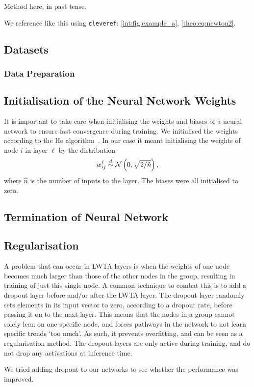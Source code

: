 Method here, in past tense.

We reference like this using \verb|cleveref|: \cref{int:fig:example_a}, \cref{theo:eq:newton2}.

\subsection{Datasets}

    \subsubsection{Data Preparation}


\subsection{Initialisation of the Neural Network Weights}
    It is important to take care when initialising the weights and biases of a neural network to ensure fast convergence during training. We initialised the weights according to the He algorithm~\citep{He}. In our case it meant initialising the weights of node $i$ in layer $\ell$ by the distribution
    \begin{align}
        w^\ell_{ij} \overset{d}{\sim} \operatorname{\mathcal{N}}\left(0,\sqrt{2/\hat{n}}\right),
    \end{align}
    where $\hat{n}$ is the number of inputs to the layer. The biases were all initialised to zero.


\subsection{Termination of Neural Network}


\subsection{Regularisation}

    A problem that can occur in LWTA layers is when the weights of one node becomes much larger than those of the other nodes in the group, resulting in training of just this single node. A common technique to combat this is to add a dropout layer before and/or after the LWTA layer. The dropout layer randomly sets elements in its input vector to zero, according to a dropout rate, before passing it on to the next layer. This means that the nodes in a group cannot solely lean on one specific node, and forces pathways in the network to not learn specific trends `too much'. As such, it prevents overfitting, and can be seen as a regularisation method. The dropout layers are only active during training, and do not drop any activations at inference time.

    We tried adding dropout to our networks to see whether the performance was improved. 
